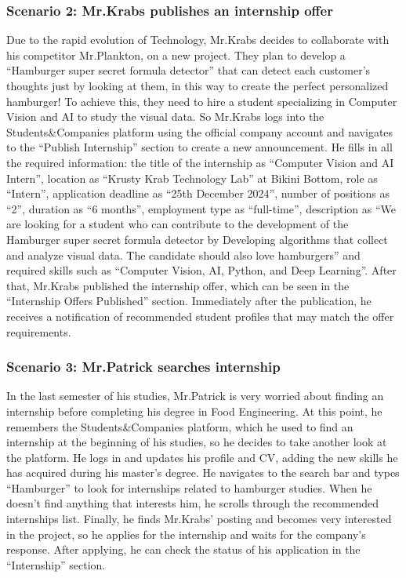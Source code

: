 \subsubsection{Scenario 2: Mr.Krabs publishes an internship offer}\label{subsubsec:scenario_2}
Due to the rapid evolution of Technology, Mr.Krabs decides to collaborate with his competitor Mr.Plankton, on a new project. They 
plan to develop a ``Hamburger super secret formula detector'' that can detect each customer's thoughts just by looking at them, in 
this way to create the perfect personalized hamburger! To achieve this, they need to hire a student specializing in Computer Vision and
AI to study the visual data. So Mr.Krabs logs into the Students\&Companies platform using the official company account
and navigates to the ``Publish Internship'' section to create a new announcement. He fills in all the required information: the title of the 
internship as ``Computer Vision and AI Intern'', location as ``Krusty Krab Technology Lab'' at Bikini Bottom, role as ``Intern'', application deadline 
as ``25th December 2024'', number of positions as ``2'', duration as ``6 months'', employment type as ``full-time'', description as ``We are looking for a 
student who can contribute to the development of the Hamburger super secret formula detector by Developing algorithms that collect and analyze 
visual data. The candidate should also love hamburgers'' and required skills such as ``Computer Vision, AI, Python, and Deep Learning''. 
After that, Mr.Krabs published the internship offer, which can be seen in the ``Internship Offers Published'' section. Immediately after 
the publication, he receives a notification of recommended student profiles that may match the offer requirements.

\subsubsection{Scenario 3: Mr.Patrick searches internship}\label{subsubsec:scenario_3}
In the last semester of his studies, Mr.Patrick is very worried about finding an internship before completing his degree in Food Engineering. 
At this point, he remembers the Students\&Companies platform, which he used to find an internship at the beginning of his studies, so he decides 
to take another look at the platform. He logs in and updates his profile and CV, adding the new skills he has acquired during his master’s degree.
He navigates to the search bar and types ``Hamburger'' to look for internships related to hamburger studies. When he doesn’t find anything that 
interests him, he scrolls through the recommended internships list. Finally, he finds Mr.Krabs' posting and becomes very interested in the 
project, so he applies for the internship and waits for the company's response. After applying, he can check the status of his application in 
the ``Internship'' section.

